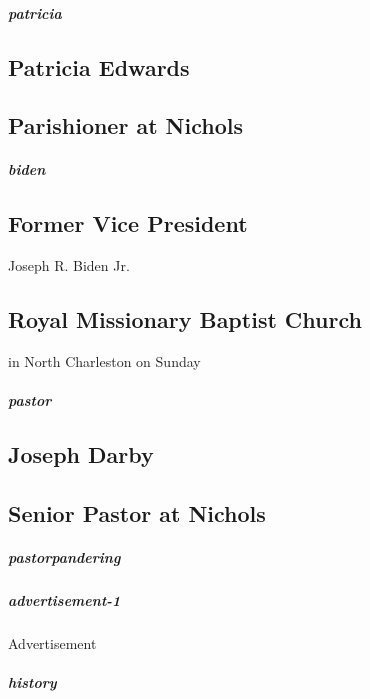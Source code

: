 \hypertarget{patricia}{%
\subparagraph{patricia}\label{patricia}}

\hypertarget{patricia-edwards}{%
\subsection{Patricia Edwards}\label{patricia-edwards}}

\hypertarget{parishioner-at-nichols}{%
\subsection{Parishioner at Nichols}\label{parishioner-at-nichols}}

\hypertarget{biden}{%
\subparagraph{biden}\label{biden}}

\hypertarget{former-vice-president}{%
\subsection{Former Vice President}\label{former-vice-president}}

Joseph R. Biden Jr.

\hypertarget{royal-missionary-baptist-church}{%
\subsection{Royal Missionary Baptist
Church}\label{royal-missionary-baptist-church}}

in North Charleston on Sunday

\hypertarget{pastor}{%
\subparagraph{pastor}\label{pastor}}

\hypertarget{joseph-darby}{%
\subsection{Joseph Darby}\label{joseph-darby}}

\hypertarget{senior-pastor-at-nichols}{%
\subsection{Senior Pastor at Nichols}\label{senior-pastor-at-nichols}}

\hypertarget{pastorpandering}{%
\subparagraph{pastorpandering}\label{pastorpandering}}

\hypertarget{advertisement-1}{%
\subparagraph{advertisement-1}\label{advertisement-1}}

Advertisement

\hypertarget{history}{%
\subparagraph{history}\label{history}}

